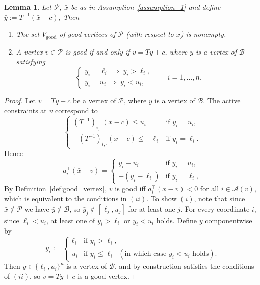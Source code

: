 \documentclass[pdflatex,sn-mathphys-num]{sn-jnl}%
\theoremstyle{thmstyleone}%
\newtheorem{lemma}[theorem]{Lemma}%
\theoremstyle{thmstyletwo}%
\theoremstyle{thmstylethree}%
\theoremstyle{thmstylethree}%
\begin{document}
\begin{lemma}\label{lem:good_vertex}
Let $\mathcal P, \ \bar x
$ 
be as in Assumption~\ref{assumption_1} and define $\bar y := T^{-1}(\bar x-c)$, Then

\begin{enumerate}
\item[(i)] The set $V_\text{good}$ of good vertices of $\mathcal P$ (with respect to $\bar x$) is nonempty.

\item[(ii)] A vertex $v\in\mathcal P$ is good if and only if $v=Ty+c$, where $y$ is a vertex of $\mathcal B$ satisfying
\[
\begin{cases}
y_i=\ell_i \ \Rightarrow\ \bar y_i>\ell_i,\\
y_i=u_i \ \Rightarrow\ \bar y_i<u_i,
\end{cases}
\qquad i=1,\dots,n.
\]
\end{enumerate}
\end{lemma}

\begin{proof}
Let $v=Ty+c$ be a vertex of $\mathcal P$, where $y$ is a vertex of $\mathcal B$.
The active constraints at $v$ correspond to
\[
\begin{cases}
(T^{-1})_{i,\cdot}(x-c) \le u_i & \text{if } y_i=u_i,\\
-(T^{-1})_{i,\cdot}(x-c) \le -\ell_i & \text{if } y_i=\ell_i.
\end{cases}
\]
Hence
\[
a_i^\top(\bar x - v)
=
\begin{cases}
\bar y_i - u_i & \text{if } y_i=u_i,\\
-(\bar y_i - \ell_i) & \text{if } y_i=\ell_i,
\end{cases}
\]
By Definition~\ref{def:good_vertex}, $v$ is good iff $a_i^\top(\bar{x}-v)<0$
for all $i\in\mathcal{A}(v)$, which is equivalent to the conditions in $(ii)$. To show $(i)$, note that since $\bar{x}\notin\mathcal{P}$ we have $\bar{y}\notin\mathcal{B}$,
so $\bar{y}_j\notin[\ell_j,u_j]$ for at least one $j$.
For every coordinate $i$, since $\ell_i < u_i$, at least one of
$\bar{y}_i>\ell_i$ or $\bar{y}_i<u_i$ holds.
Define $y$ componentwise by
\[
  y_i :=
  \begin{cases}
    \ell_i & \text{if } \bar{y}_i > \ell_i,\\
    u_i   & \text{if } \bar{y}_i \leq \ell_i
             \;\;(\text{in which case } \bar{y}_i < u_i \text{ holds}).
  \end{cases}
\]
Then $y\in\{\ell_i,u_i\}^n$ is a vertex of $\mathcal{B}$, and by
construction satisfies the conditions of $(ii)$, so $v=Ty+c$ is a good
vertex.
\end{proof}
\end{document}
